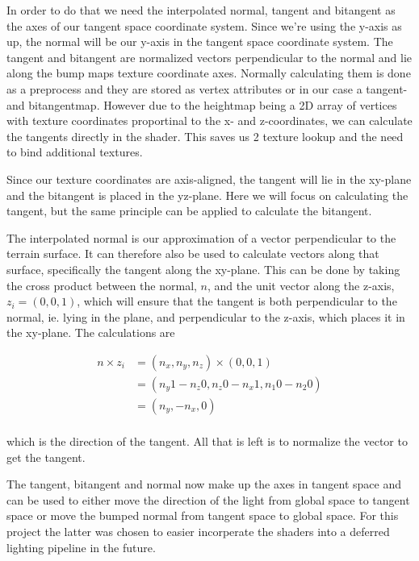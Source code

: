 In order to do that we need the interpolated normal, tangent and
bitangent as the axes of our tangent space coordinate system. Since
we're using the y-axis as up, the normal will be our y-axis in the
tangent space coordinate system. The tangent and bitangent are
normalized vectors perpendicular to the normal and lie along the bump
maps texture coordinate axes. Normally calculating them is done as a
preprocess and they are stored as vertex attributes or in our case a
tangent- and bitangentmap. However due to the heightmap being a 2D
array of vertices with texture coordinates proportinal to the x- and
z-coordinates, we can calculate the tangents directly in the
shader. This saves us 2 texture lookup and the need to bind additional
textures.

Since our texture coordinates are axis-aligned, the tangent will lie
in the xy-plane and the bitangent is placed in the yz-plane. Here we
will focus on calculating the tangent, but the same principle can be
applied to calculate the bitangent.

The interpolated normal is our approximation of a vector perpendicular
to the terrain surface. It can therefore also be used to calculate
vectors along that surface, specifically the tangent along the
xy-plane. This can be done by taking the cross product between the
normal, $n$, and the unit vector along the z-axis, $z_i = (0,0,1)$, which
will ensure that the tangent is both perpendicular to the normal, ie.
lying in the plane, and perpendicular to the z-axis, which places it
in the xy-plane. The calculations are

\begin{displaymath}
  \begin{array}{rl}
  n \times z_i &= (n_x, n_y, n_z) \times (0,0,1)\\
  &= (n_y 1 - n_z 0, n_z 0 - n_x 1, n_1 0 - n_2 0) \\
  &= (n_y, - n_x, 0) \\
  \end{array}
\end{displaymath}

which is the direction of the tangent. All that is left is to
normalize the vector to get the tangent.

The tangent, bitangent and normal now make up the axes in tangent
space and can be used to either move the direction of the light from
global space to tangent space or move the bumped normal from tangent
space to global space. For this project the latter was chosen to
easier incorperate the shaders into a deferred lighting pipeline in
the future.

